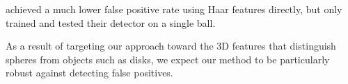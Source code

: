 \documentclass[11pt]{scrartcl}
\begin{document}
{        \citet{Treptow2004filter} achieved a much lower false positive rate
        using Haar features directly, but only trained and tested their
        detector on a single ball.




        As a result of targeting our approach toward the 3D features that
        distinguish spheres from objects such as disks, we expect our method
        to be particularly robust against detecting false positives.
	}
\end{document}
